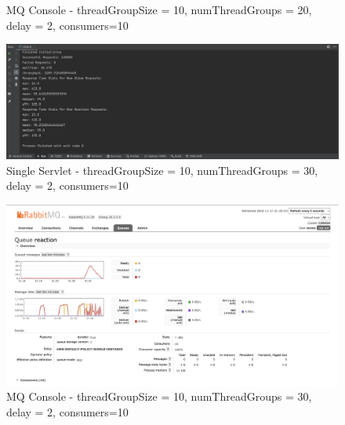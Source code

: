 \documentclass[a4paper,12pt]{article} %
\begin{document}
\begin{enumerate}
\begin{figure}[H]
    \caption{MQ Console - threadGroupSize = 10, numThreadGroups = 20, delay = 2, consumers=10}
\end{figure}
\begin{figure}[H]
    \centering
    \includegraphics[width=\textwidth]{images/stats_30.png}
    \caption{Single Servlet - threadGroupSize = 10, numThreadGroups = 30, delay = 2, consumers=10}
\end{figure}
\begin{figure}[H]
    \centering
    \includegraphics[width=\textwidth]{images/mq_console_30.png}
    \caption{MQ Console - threadGroupSize = 10, numThreadGroups = 30, delay = 2, consumers=10}
\end{figure}



\end{enumerate}
\end{document}
